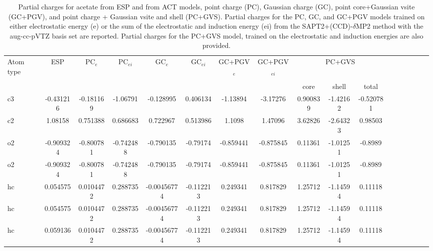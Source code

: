 \begin{sidewaystable}
\caption{Partial charges for acetate from ESP and from ACT models, point charge (PC), Gaussian charge (GC), point core+Gaussian vsite (GC+PGV), and point charge + Gaussian vsite and shell (PC+GVS).  Partial charges for the PC, GC, and GC+PGV models trained on either electrostatic energy (e) or the sum of the electrostatic and induction energy (ei) from the SAPT2+(CCD)-$\delta$MP2 method with the aug-cc-pVTZ basis set are reported. Partial charges for the PC+GVS model, trained on the electrostatic and induction energies are also provided.}
\hspace{-1cm}
\begin{tabular}{lcccccccccccccccc}
\hline
 Atom type & ESP & PC$_{e}$ & PC$_{ei}$ & GC$_{e}$ & GC$_{ei}$ & GC+PGV$_{e}$ & GC+PGV$_{ei}$ & \multicolumn{3}{c}{PC+GVS} \\\\
 & & & & & & & & core & shell & total \\
\hline
 c3 & -0.431216 & -0.181169 & -1.06791 & -0.128995 &  0.406134 & -1.13894 &  -3.17276 & 0.900839 & -1.42162 & -0.520781 \\
 c2 & 1.08158 & 0.751388 & 0.686683 & 0.722967 &  0.513986 & 1.1098 &  1.47096 & 3.62826 & -2.64323 & 0.98503 \\
 o2 & -0.909324 & -0.800781 & -0.742488 & -0.790135 &  -0.79174 & -0.859441 &  -0.875845 & 0.11361 & -1.01251 & -0.8989 \\
 o2 & -0.909324 & -0.800781 & -0.742488 & -0.790135 &  -0.79174 & -0.859441 &  -0.875845 & 0.11361 & -1.01251 & -0.8989 \\
 hc & 0.054575 & 0.0104472 & 0.288735 & -0.00456774 &  -0.112213 & 0.249341 &  0.817829 & 1.25712 & -1.14594 & 0.11118 \\
 hc & 0.054575 & 0.0104472 & 0.288735 & -0.00456774 &  -0.112213 & 0.249341 &  0.817829 & 1.25712 & -1.14594 & 0.11118 \\
 hc & 0.059136 & 0.0104472 & 0.288735 & -0.00456774 &  -0.112213 & 0.249341 &  0.817829 & 1.25712 & -1.14594 & 0.11118 \\
\hline
\end{tabular}
\end{sidewaystable}
